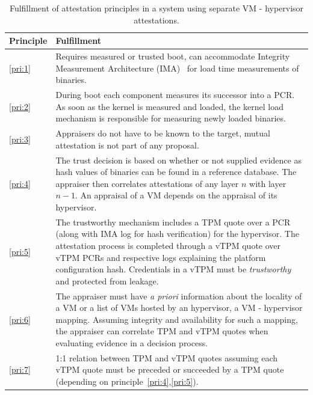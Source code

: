 \begin{table}
  \caption{Fulfillment of attestation principles in a system using separate VM - hypervisor attestations.}
\label{tab:1}
  \centering
\begin{tabular}{p{1cm}|p{}} %
 \toprule
 Principle & Fulfillment \\ \midrule
 \ref{pri:1} & Requires measured or trusted boot, can accommodate Integrity Measurement Architecture (IMA)~\cite{IMA} for load time measurements of binaries.\\
 \midrule
 \ref{pri:2} & During boot each component measures its successor into a PCR. As soon as the kernel is measured and loaded, the kernel load mechanism is responsible for measuring newly loaded binaries. \\ 
 \midrule
 \ref{pri:3} & Appraisers do not have to be known to the target, mutual attestation is not part of any proposal. \\
 \midrule
 \ref{pri:4} & The trust decision is based on whether or not supplied evidence as hash values of binaries can be found in a reference database. The appraiser then correlates attestations of any layer $n$ with layer $n-1$. An appraisal of a VM depends on the appraisal of its hypervisor. \\
 \midrule
 \ref{pri:5} & The trustworthy mechanism includes a TPM quote over a PCR (along with IMA log for hash verification) for the hypervisor. The attestation process is completed through a vTPM quote over vTPM PCRs and respective logs explaining the platform configuration hash. Credentials in a vTPM must be \emph{trustworthy} and protected from leakage. \\
 \midrule
 \ref{pri:6} & The appraiser must have \emph{a priori} information about the locality of a VM or a list of VMs hosted by an hypervisor, a VM - hypervisor mapping. Assuming integrity and availability for such a mapping, the appraiser can correlate TPM and vTPM quotes when evaluating evidence in a decision process. \\
 \midrule
 \ref{pri:7} & 1:1 relation between TPM and vTPM quotes assuming each vTPM quote must be preceded or succeeded by a TPM quote (depending on principle~\ref{pri:4},\ref{pri:5}). \\
 \bottomrule
\end{tabular}
\end{table}

